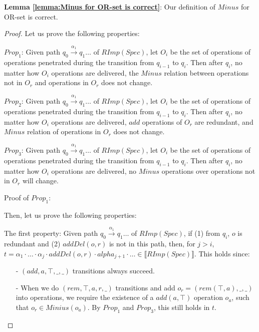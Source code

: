 {\noindent \bf Lemma \ref{lemma:Minus for OR-set is correct}}: Our definition of $Minus$ for OR-set is correct.

\begin {proof} 

Let us prove the following properties: 

\noindent $Prop_1$: Given path $q_0 {\xrightarrow{\alpha_1}} q_1 \ldots$ of $RImp(Spec)$, let $O_i$ be the set of operations of operations penetrated during the transition from $q_{i-1}$ to $q_i$. Then after $q_i$, no matter how $O_i$ operations are delivered, the $Minus$ relation between operations not in $O_r$ and operations in $O_r$ does not change.  

\noindent $Prop_2$: Given path $q_0 {\xrightarrow{\alpha_1}} q_1 \ldots$ of $RImp(Spec)$, let $O_i$ be the set of operations of operations penetrated during the transition from $q_{i-1}$ to $q_i$. Then after $q_i$, no matter how $O_i$ operations are delivered, $add$ operations of $O_r$ are redundant, and $Minus$ relation of operations in $O_r$ does not change.

\noindent $Prop_3$: Given path $q_0 {\xrightarrow{\alpha_1}} q_1 \ldots$ of $RImp(Spec)$, let $O_i$ be the set of operations of operations penetrated during the transition from $q_{i-1}$ to $q_i$. Then after $q_i$, no matter how $O_i$ operations are delivered, no $Minus$ operations over operations not in $O_r$ will change.

Proof of $Prop_1$:  



Then, let us prove the following properties: 

The first property: Given path $q_0 {\xrightarrow{\alpha_1}} q_1 \ldots$ of $RImp(Spec)$, if (1) from $q_i$, $o$ is redundant and (2) $addDel(o,r)$ is not in this path, then, for $j>i$, $t=\alpha_1 \cdot \ldots \cdot \alpha_j \cdot addDel(o,r) \cdot alpha_{j+1} \cdot \ldots \in \llbracket RImp(Spec) \rrbracket$. This holds since:

\begin{itemize}
\setlength{\itemsep}{0.5pt}
\item[-] $(add,a,\top,\_,\_)$ transitions always succeed. 

\item[-] When we do $(rem,\top,a,r,\_)$ transitions and add $o_r=(rem(\top,a),\_,\_)$ into operations, we require the existence of a $add(a,\top)$ operation $o_a$, such that $o_r \in Minius(o_a)$. By $Prop_1$ and $Prop_3$, this still holds in $t$. 


\end{itemize}
\end{proof}
